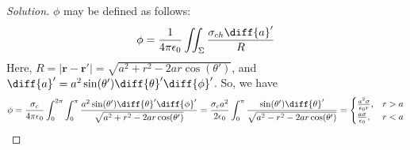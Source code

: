 \documentclass[crop=false,class=article,oneside]{standalone}
\begin{document}
        \begin{proof}[Solution]
            $\phi$ may be defined as follows:
            \begin{equation*}
                \phi
                =\frac{1}{4\pi\epsilon_{0}}
                \iint_{\Sigma}\frac{\sigma_{ch}\diff{a}'}{R}
            \end{equation*}
            Here,
            $R=|\mathbf{r}-\mathbf{r}'|%
             =\sqrt{a^2+r^2-2ar\cos(\theta')}$,
            and
            $\diff{a}'=a^2\sin(\theta')\diff{\theta}'\diff{\phi}'$.
            So, we have
            \begin{equation*}
                \phi=\frac{\sigma_c}{4\pi\epsilon_0}
                \int_{0}^{2\pi}\int_{0}^{\pi}
                \frac{a^2\sin(\theta')\diff{\theta}'\diff{\phi}'}
                     {\sqrt{a^2+r^2-2ar\cos(\theta')}}
                =\frac{\sigma_c a^2}{2\epsilon_0}
                \int_{0}^{\pi}
                \frac{\sin(\theta')\diff{\theta}'}
                     {\sqrt{a^2-r^2-2ar\cos(\theta')}}
                =
                \begin{cases}
                    \frac{a^{2}\sigma}{\epsilon_{0}r},
                    &r>a\\
                    \frac{a\sigma}{\epsilon_{0}},
                    &r<a
                \end{cases}
            \end{equation*}
        \end{proof}
\end{document}
